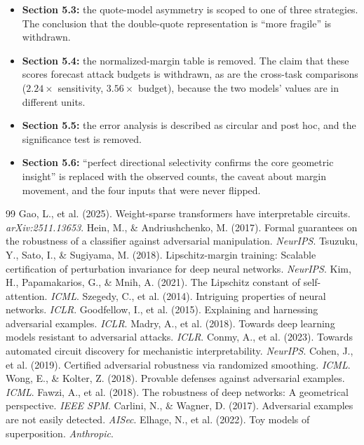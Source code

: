 \documentclass[11pt]{article}
\begin{document}
\begin{itemize}
  \item \textbf{Section 5.3:} the quote-model asymmetry is scoped to one of three strategies. The conclusion that the double-quote representation is ``more fragile'' is withdrawn.
  \item \textbf{Section 5.4:} the normalized-margin table is removed. The claim that these scores forecast attack budgets is withdrawn, as are the cross-task comparisons ($2.24\times$ sensitivity, $3.56\times$ budget), because the two models' values are in different units.
  \item \textbf{Section 5.5:} the error analysis is described as circular and post hoc, and the significance test is removed.
  \item \textbf{Section 5.6:} ``perfect directional selectivity confirms the core geometric insight'' is replaced with the observed counts, the caveat about margin movement, and the four inputs that were never flipped.
\end{itemize}

\begin{thebibliography}{99}\small
{} Gao, L., et al. (2025). Weight-sparse transformers have interpretable circuits. \emph{arXiv:2511.13653}.
 Hein, M., \& Andriushchenko, M. (2017). Formal guarantees on the robustness of a classifier against adversarial manipulation. \emph{NeurIPS}.
 Tsuzuku, Y., Sato, I., \& Sugiyama, M. (2018). Lipschitz-margin training: Scalable certification of perturbation invariance for deep neural networks. \emph{NeurIPS}.
 Kim, H., Papamakarios, G., \& Mnih, A. (2021). The Lipschitz constant of self-attention. \emph{ICML}.
 Szegedy, C., et al. (2014). Intriguing properties of neural networks. \emph{ICLR}.
 Goodfellow, I., et al. (2015). Explaining and harnessing adversarial examples. \emph{ICLR}.
 Madry, A., et al. (2018). Towards deep learning models resistant to adversarial attacks. \emph{ICLR}.
 Conmy, A., et al. (2023). Towards automated circuit discovery for mechanistic interpretability. \emph{NeurIPS}.
 Cohen, J., et al. (2019). Certified adversarial robustness via randomized smoothing. \emph{ICML}.
 Wong, E., \& Kolter, Z. (2018). Provable defenses against adversarial examples. \emph{ICML}.
 Fawzi, A., et al. (2018). The robustness of deep networks: A geometrical perspective. \emph{IEEE SPM}.
 Carlini, N., \& Wagner, D. (2017). Adversarial examples are not easily detected. \emph{AISec}.
 Elhage, N., et al. (2022). Toy models of superposition. \emph{Anthropic}.
\end{thebibliography}
\end{document}
